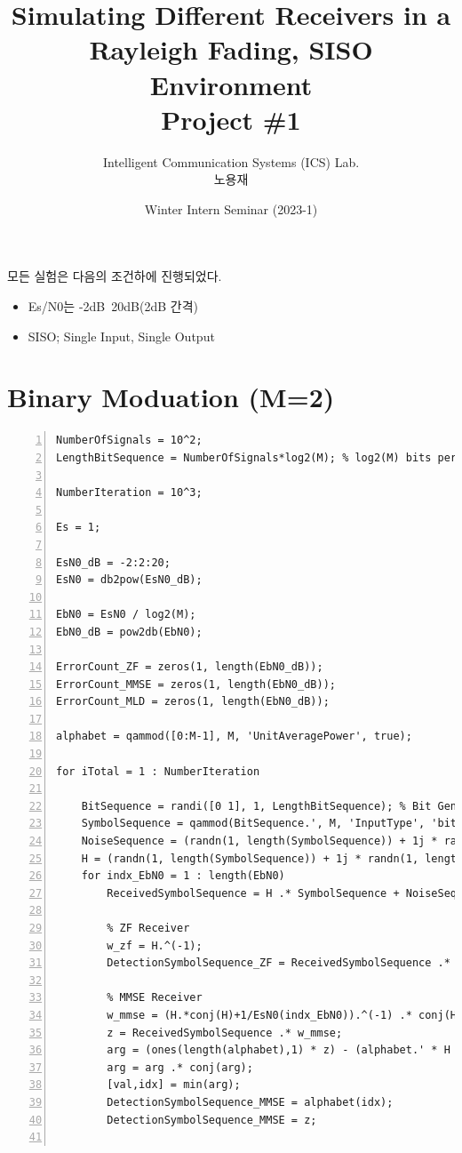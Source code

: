 \documentclass{article}
\title{Simulating Different Receivers in a \\Rayleigh Fading, SISO Environment\\
\large Project \#1}
\author{Intelligent Communication Systems (ICS) Lab.\\노용재}
\date{Winter Intern Seminar (2023-1)}
\begin{document}
\maketitle

모든 실험은 다음의 조건하에 진행되었다.

\begin{itemize}
  \item Es/N0는 -2dB~20dB(2dB 간격)
  \item SISO; Single Input, Single Output
\end{itemize}
\section{Binary Moduation (M=2)}
\begin{lstlisting}[style=Matlab-editor,
frame=single,
numbers=left,]
% Simulation
NumberOfSignals = 10^2;
LengthBitSequence = NumberOfSignals*log2(M); % log2(M) bits per signal

NumberIteration = 10^3;

Es = 1;

EsN0_dB = -2:2:20;
EsN0 = db2pow(EsN0_dB);

EbN0 = EsN0 / log2(M);
EbN0_dB = pow2db(EbN0);

ErrorCount_ZF = zeros(1, length(EbN0_dB));
ErrorCount_MMSE = zeros(1, length(EbN0_dB));
ErrorCount_MLD = zeros(1, length(EbN0_dB));

alphabet = qammod([0:M-1], M, 'UnitAveragePower', true);

for iTotal = 1 : NumberIteration
    
    BitSequence = randi([0 1], 1, LengthBitSequence); % Bit Generation
    SymbolSequence = qammod(BitSequence.', M, 'InputType', 'bit', 'UnitAveragePower', 1).';
    NoiseSequence = (randn(1, length(SymbolSequence)) + 1j * randn(1, length(SymbolSequence))) / sqrt(2); % Noise (n) Generation
    H = (randn(1, length(SymbolSequence)) + 1j * randn(1, length(SymbolSequence))) ./ sqrt(2); % Channel (h) Generation
    for indx_EbN0 = 1 : length(EbN0)
        ReceivedSymbolSequence = H .* SymbolSequence + NoiseSequence * sqrt(1 / EsN0(indx_EbN0)); % Received Signal (y = s + n) Generation

        % ZF Receiver
        w_zf = H.^(-1);
        DetectionSymbolSequence_ZF = ReceivedSymbolSequence .* w_zf; % Detection (Zero-Forcing: y / h)

        % MMSE Receiver
        w_mmse = (H.*conj(H)+1/EsN0(indx_EbN0)).^(-1) .* conj(H);
        z = ReceivedSymbolSequence .* w_mmse;
        arg = (ones(length(alphabet),1) * z) - (alphabet.' * H .* w_mmse);
        arg = arg .* conj(arg);
        [val,idx] = min(arg);
        DetectionSymbolSequence_MMSE = alphabet(idx);
        DetectionSymbolSequence_MMSE = z;


\end{lstlisting}
\end{document}
